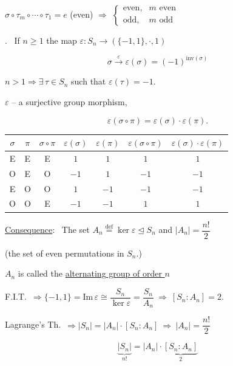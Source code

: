\bigskip
\noindent $\sigma\circ\tau_m\circ\cdots\circ\tau_1 = e$ (even) \quad $\Rightarrow$ \quad
$\begin{cases} \text{even}, & m \text{ even}\\ \text{odd}, & m \text{ odd} \end{cases}$

\bigskip
\noindent{}. \ If $n\geq 1$ the map $\varepsilon: S_n \to (\{-1,1\},\cdot,1)$

\[
\sigma \xrightarrow{\ \varepsilon\ } \varepsilon(\sigma) = (-1)^{\text{inv}(\sigma)}
\]

\noindent $n>1 \Rightarrow \exists\,\tau\in S_n$ such that $\varepsilon(\tau)=-1$.

\bigskip
\noindent $\varepsilon$ -- a surjective group morphism,

\[
\varepsilon(\sigma\circ\pi) = \varepsilon(\sigma)\cdot\varepsilon(\pi).
\]

\bigskip
\begin{center}
\begin{tabular}{|c|c|c|c|c|c|c|}
\hline
$\sigma$ & $\pi$ & $\sigma\circ\pi$ & $\varepsilon(\sigma)$ & $\varepsilon(\pi)$ & $\varepsilon(\sigma\circ\pi)$ & $\varepsilon(\sigma)\cdot\varepsilon(\pi)$ \\
\hline
E & E & E & $1$ & $1$ & $1$ & $1$ \\
\hline
O & E & O & $-1$ & $1$ & $-1$ & $-1$ \\
\hline
E & O & O & $1$ & $-1$ & $-1$ & $-1$ \\
\hline
O & O & E & $-1$ & $-1$ & $1$ & $1$ \\
\hline
\end{tabular}
\end{center}

\bigskip
\noindent\underline{Consequence}: \ The set $A_n \overset{\text{def}}{=} \ker\varepsilon \trianglelefteq S_n$ and $|A_n| = \dfrac{n!}{2}$

\noindent (the set of even permutations in $S_n$.)

\noindent $A_n$ is called the \underline{alternating group of order $n$}

\bigskip
\noindent F.I.T.\ $\Rightarrow \{-1,1\} = \text{Im}\,\varepsilon \cong \dfrac{S_n}{\ker\varepsilon} = \dfrac{S_n}{A_n} \ \Rightarrow \ [S_n:A_n]=2.$

\bigskip
\noindent Lagrange's Th.\ $\Rightarrow |S_n| = |A_n|\cdot[S_n:A_n] \ \Rightarrow \ |A_n| = \dfrac{n!}{2}$

\[
\underbrace{|S_n|}_{n!} = |A_n|\cdot\underbrace{[S_n:A_n]}_{2}
\]

